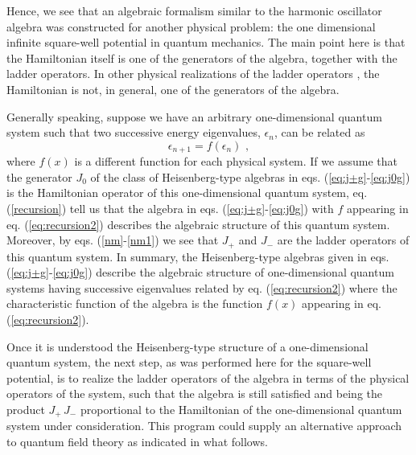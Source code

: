 \documentclass[a4paper,12pt]{article}
\begin{document}
Hence, we see that an algebraic formalism similar to 
the harmonic oscillator algebra was constructed for another 
physical problem: the one dimensional infinite square-well 
potential in quantum mechanics. The main point here is that 
the Hamiltonian itself is one of the generators of the algebra, 
together with the ladder operators. In other physical realizations 
of the ladder operators \cite{morse}, the Hamiltonian is not, 
in general, one of the generators of the algebra. 

Generally speaking, suppose we have
an arbitrary one-dimensional quantum system such that
two successive energy eigenvalues, $\epsilon_n$, can be 
related as 
\begin{equation}
\epsilon_{n+1} = f(\epsilon_{n}) \, \, ,
\label{eq:recursion2}
\end{equation} 
where 
$f(x)$ is a different function for each physical
system. If we assume that the generator $J_0$ of 
the class of Heisenberg-type algebras in
eqs. (\ref{eq:j+g}-\ref{eq:j0g}) is the Hamiltonian
operator of this one-dimensional quantum system,
eq. (\ref{recursion}) tell us that the algebra
in eqs. (\ref{eq:j+g}-\ref{eq:j0g}) with $f$ appearing
in eq. (\ref{eq:recursion2}) describes the algebraic
structure of this quantum system. Moreover, by 
eqs. (\ref{nm}-\ref{nm1}) we see that $J_+$ and $J_-$ 
are the ladder operators of this quantum system. 
In summary, the Heisenberg-type algebras  
\cite{algebra2} given in eqs. (\ref{eq:j+g}-\ref{eq:j0g})
describe the algebraic structure of one-dimensional
quantum systems having successive eigenvalues
related by eq. (\ref{eq:recursion2}) where the
characteristic function of the algebra is the function
$f(x)$ appearing in eq. (\ref{eq:recursion2}).

Once it is understood the Heisenberg-type structure
of a one-dimensional quantum system, the next step,
as was performed here for the square-well potential,
is to realize the ladder operators of the algebra
in terms of the physical operators of the system, such 
that the algebra 
is still satisfied and being the product $J_+ \, J_-$ 
proportional to the Hamiltonian of the one-dimensional
quantum system under consideration.
This program could supply an alternative approach
to quantum field theory as indicated in what
follows.
\end{document}
